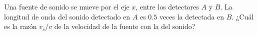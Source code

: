 \begin{mdframed}[style=warning]
	\begin{ejercicio}
		Una fuente de sonido se mueve por el eje $x$, entre los detectores $A$ y $B$. La longitud de onda del sonido detectado en $A$ es $0.5$ veces la detectada en $B$. ¿Cuál es la razón $v_s /v$ de la velocidad de la fuente con la del sonido?
	\end{ejercicio}
\end{mdframed}









































